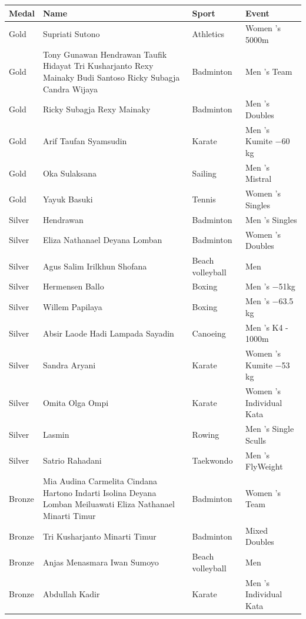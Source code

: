 \documentclass{article}
\begin{document}
\begin{tabular}{llll}
\toprule
Medal & Name & Sport & Event \\
\midrule
Gold & Supriati Sutono & Athletics & Women 's 5000m \\
Gold & Tony Gunawan Hendrawan Taufik Hidayat Tri Kusharjanto Rexy Mainaky Budi Santoso Ricky Subagja Candra Wijaya & Badminton & Men 's Team \\
Gold & Ricky Subagja Rexy Mainaky & Badminton & Men 's Doubles \\
Gold & Arif Taufan Syamsudin & Karate & Men 's Kumite −60 kg \\
Gold & Oka Sulaksana & Sailing & Men 's Mistral \\
Gold & Yayuk Basuki & Tennis & Women 's Singles \\
Silver & Hendrawan & Badminton & Men 's Singles \\
Silver & Eliza Nathanael Deyana Lomban & Badminton & Women 's Doubles \\
Silver & Agus Salim Irilkhun Shofana & Beach volleyball & Men \\
Silver & Hermensen Ballo & Boxing & Men 's −51kg \\
Silver & Willem Papilaya & Boxing & Men 's −63.5 kg \\
Silver & Absir Laode Hadi Lampada Sayadin & Canoeing & Men 's K4 - 1000m \\
Silver & Sandra Aryani & Karate & Women 's Kumite −53 kg \\
Silver & Omita Olga Ompi & Karate & Women 's Individual Kata \\
Silver & Lasmin & Rowing & Men 's Single Sculls \\
Silver & Satrio Rahadani & Taekwondo & Men 's FlyWeight \\
Bronze & Mia Audina Carmelita Cindana Hartono Indarti Isolina Deyana Lomban Meiluawati Eliza Nathanael Minarti Timur & Badminton & Women 's Team \\
Bronze & Tri Kusharjanto Minarti Timur & Badminton & Mixed Doubles \\
Bronze & Anjas Menasmara Iwan Sumoyo & Beach volleyball & Men \\
Bronze & Abdullah Kadir & Karate & Men 's Individual Kata \\
\bottomrule
\end{tabular}
\end{document}
